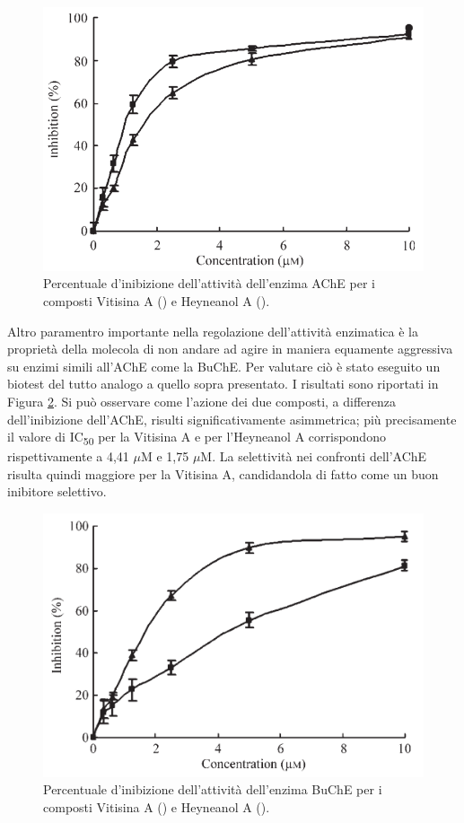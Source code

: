\documentclass[a4paper, 12pt]{article}
\begin{document}
\begin{figure}[H]
	\centering
	\includegraphics[width=.9\linewidth]{immagini/risache_resveratrolo.png}
	\caption{Percentuale d'inibizione dell'attività dell'enzima AChE per i composti Vitisina A () e Heyneanol A (). }
	\label{fig:risache_resveratrolo}
\end{figure}

Altro paramentro importante nella regolazione dell'attività enzimatica è la proprietà della molecola di non andare ad agire in maniera equamente aggressiva su enzimi simili all'AChE come la BuChE. Per valutare ciò è stato eseguito un biotest del tutto analogo a quello sopra presentato. I risultati sono riportati in Figura \ref{fig:risbuche_resveratrolo}. Si può osservare come l'azione dei due composti, a differenza dell'inibizione dell'AChE, risulti significativamente asimmetrica; più precisamente il valore di IC\textsubscript{50} per la Vitisina A e per l'Heyneanol A corrispondono rispettivamente a 4,41 $\mu$M e 1,75 $\mu$M. La selettività nei confronti dell'AChE risulta quindi maggiore per la Vitisina A, candidandola di fatto come un buon inibitore selettivo. \cite{jang_inhibition_2008}

\begin{figure}[H]
	\centering
	\includegraphics[width=.9\linewidth]{immagini/risbuche_resveratrolo.png}
	\caption{Percentuale d'inibizione dell'attività dell'enzima BuChE per i composti Vitisina A () e Heyneanol A (). }
	\label{fig:risbuche_resveratrolo}
\end{figure}
\end{document}
